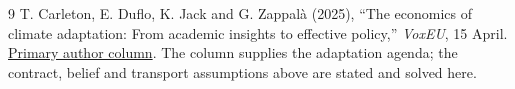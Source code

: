 \documentclass[11pt,a4paper]{article}
\theoremstyle{remark}
\begin{document}
\begin{thebibliography}{9}
 T. Carleton, E. Duflo, K. Jack and G. Zappal\`a (2025), ``The economics of climate adaptation: From academic insights to effective policy,'' \emph{VoxEU}, 15 April. \href{https://cepr.org/voxeu/columns/economics-climate-adaptation-academic-insights-effective-policy}{Primary author column}. The column supplies the adaptation agenda; the contract, belief and transport assumptions above are stated and solved here.
\end{thebibliography}
\end{document}

